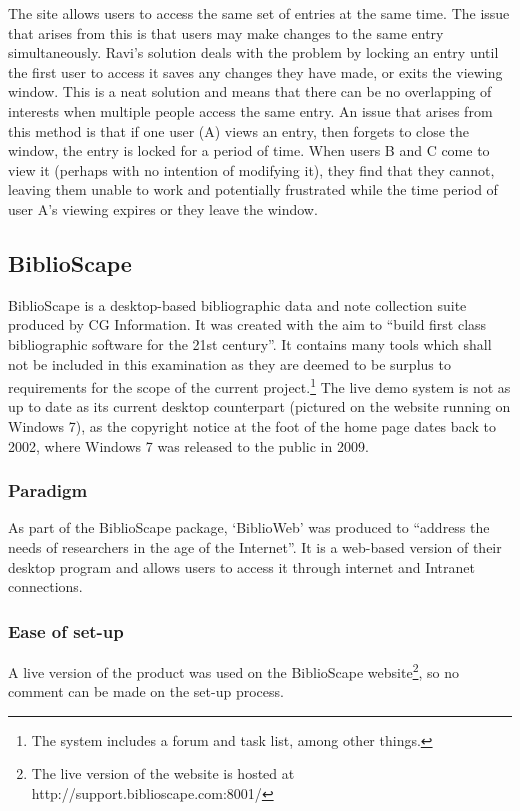 \documentclass{l4proj}
\begin{document}
The site allows users to access the same set of entries at the same time.  The issue that arises from this is that users may make changes to the same entry simultaneously.  Ravi's solution deals with the problem by locking an entry until the first user to access it saves any changes they have made, or exits the viewing window.  This is a neat solution and means that there can be no overlapping of interests when multiple people access the same entry.  An issue that arises from this method is that if one user (A) views an entry, then forgets to close the window, the entry is locked for a period of time.  When users B and C come to view it (perhaps with no intention of modifying it), they find that they cannot, leaving them unable to work and potentially frustrated while the time period of user A's viewing expires or they leave the window.

\subsection{BiblioScape}
BiblioScape is a desktop-based bibliographic data and note collection suite produced by CG Information.  It was created with the aim to ``build first class bibliographic software for the 21st century''.  It contains many tools which shall not be included in this examination as they are deemed to be surplus to requirements for the scope of the current project.\footnote{The system includes a forum and task list, among other things.} The live demo system is not as up to date as its current desktop counterpart (pictured on the website running on Windows 7), as the copyright notice at the foot of the home page dates back to 2002, where Windows 7 was released to the public in 2009\cite{Win7Release}.
\subsubsection{Paradigm}
As part of the BiblioScape package, `BiblioWeb' was produced to ``address the needs of researchers in the age of the Internet''\cite{BiblioWebWhy}.  It is a web-based version of their desktop program and allows users to access it through internet and Intranet connections.
\subsubsection{Ease of set-up}
A live version of the product was used on the BiblioScape website\footnote{The live version of the website is hosted at http://support.biblioscape.com:8001/}, so no comment can be made on the set-up process.
\end{document}
